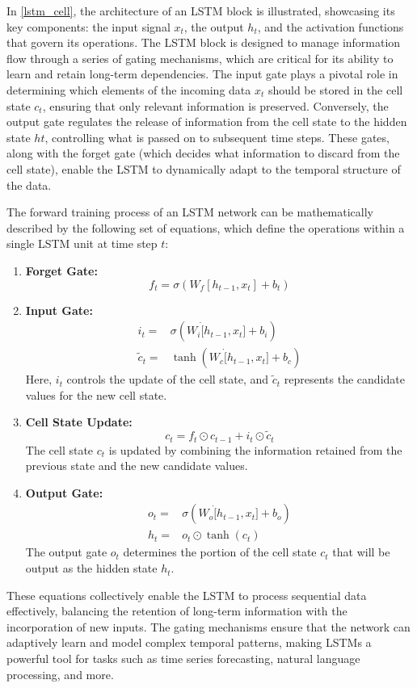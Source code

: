 \documentclass{dsfe}
\begin{document}
In \autoref{lstm_cell}, the architecture of an LSTM block is illustrated, showcasing its key components: the input signal $x_t$, the output $h_t$, and the activation functions that govern its operations. The LSTM block is designed to manage information flow through a series of gating mechanisms, which are critical for its ability to learn and retain long-term dependencies. The input gate plays a pivotal role in determining which elements of the incoming data $x_t$ should be stored in the cell state $c_t$, ensuring that only relevant information is preserved. Conversely, the output gate regulates the release of information from the cell state to the hidden state $ht$, controlling what is passed on to subsequent time steps. These gates, along with the forget gate (which decides what information to discard from the cell state), enable the LSTM to dynamically adapt to the temporal structure of the data.

The forward training process of an LSTM network can be mathematically described by the following set of equations, which define the operations within a single LSTM unit at time step $t$:
\begin{enumerate}
\item \textbf{Forget Gate:}
\begin{equation}
f_t  =  \sigma\left(W_f [h_{t-1}, x_t]+b_t \right)
\end{equation}
\item \textbf{Input Gate:}
\begin{align}
i_t  =  & \sigma\left(W_i \dot [h_{t-1}, x_t]+b_i \right)\\
\tilde{c}_t = & \tanh\left(W_c \dot [h_{t-1}, x_t]+b_c\right)
\end{align}
Here, $i_t$ controls the update of the cell state, and $\tilde{c}_t$ represents the candidate values for the new cell state.
\item \textbf{Cell State Update:}
\begin{equation}
c_t  =  f_t \odot c_{t-1}+i_t \odot \tilde{c}_t
\end{equation}
The cell state $c_t$ is updated by combining the information retained from the previous state and the new candidate values.
\item \textbf{Output Gate:}
\begin{align}
o_t  = &  \sigma\left(W_o \dot [h_{t-1}, x_t]+b_o \right)\\
h_t  = &  o_t\odot \tanh(c_t)
\end{align}
The output gate $o_t$ determines the portion of the cell state $c_t$ that will be output as the hidden state $h_t$.
\end{enumerate}
These equations collectively enable the LSTM to process sequential data effectively, balancing the retention of long-term information with the incorporation of new inputs. The gating mechanisms ensure that the network can adaptively learn and model complex temporal patterns, making LSTMs a powerful tool for tasks such as time series forecasting, natural language processing, and more.
\end{document}
